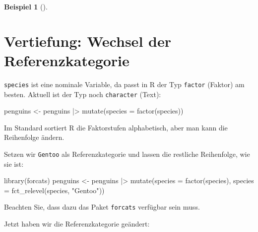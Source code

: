 \documentclass[
  ngerman,
  letterpaper,
  twoside,
  open=any]{scrbook}
\newenvironment{Shaded}{\begin{snugshade}}{\end{snugshade}}
\newcommand{\AttributeTok}[1]{\textcolor[rgb]{0.40,0.45,0.13}{#1}}
\newcommand{\DocumentationTok}[1]{\textcolor[rgb]{0.37,0.37,0.37}{\textit{#1}}}
\newcommand{\FunctionTok}[1]{\textcolor[rgb]{0.28,0.35,0.67}{#1}}
\newcommand{\NormalTok}[1]{\textcolor[rgb]{0.00,0.23,0.31}{#1}}
\newcommand{\OtherTok}[1]{\textcolor[rgb]{0.00,0.23,0.31}{#1}}
\newcommand{\SpecialCharTok}[1]{\textcolor[rgb]{0.37,0.37,0.37}{#1}}
\newcommand{\StringTok}[1]{\textcolor[rgb]{0.13,0.47,0.30}{#1}}
\theoremstyle{definition}
\newtheorem{example}{Beispiel}[chapter]
\theoremstyle{plain}
\theoremstyle{definition}
\theoremstyle{definition}
\theoremstyle{remark}
\begin{document}
\begin{example}[]
\section{Vertiefung: Wechsel der
Referenzkategorie}\label{vertiefung-wechsel-der-referenzkategorie}

\texttt{species} ist eine nominale Variable, da passt in R der Typ
\texttt{factor} (Faktor) am besten. Aktuell ist der Typ noch
\texttt{character} (Text):

\begin{Shaded}
\begin{Highlighting}[]
\NormalTok{penguins }\OtherTok{\textless{}{-}}\NormalTok{ penguins }\SpecialCharTok{|\textgreater{}} 
  \FunctionTok{mutate}\NormalTok{(}\AttributeTok{species =} \FunctionTok{factor}\NormalTok{(species))}
\end{Highlighting}
\end{Shaded}

Im Standard sortiert R die Faktorstufen alphabetisch, aber man kann die
Reihenfolge ändern.

\begin{Shaded}
\end{Shaded}

Setzen wir \texttt{Gentoo} als Referenzkategorie und lassen die
restliche Reihenfolge, wie sie ist:

\begin{Shaded}
\begin{Highlighting}[]
\FunctionTok{library}\NormalTok{(forcats)}
\NormalTok{penguins }\OtherTok{\textless{}{-}}\NormalTok{ penguins }\SpecialCharTok{|\textgreater{}} 
  \FunctionTok{mutate}\NormalTok{(}\AttributeTok{species =} \FunctionTok{factor}\NormalTok{(species),}
    \AttributeTok{species =} \FunctionTok{fct\_relevel}\NormalTok{(species, }\StringTok{"Gentoo"}\NormalTok{))}
\end{Highlighting}
\end{Shaded}

Beachten Sie, dass dazu das Paket \texttt{forcats} verfügbar sein muss.

Jetzt haben wir die Referenzkategorie geändert:

\begin{Shaded}
\end{Shaded}


\end{example}
\end{document}
